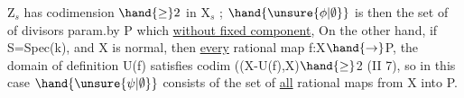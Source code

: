 
Z$_s$ has codimension $\hand{\geq} 2$ in X$_s$ ; 
$\hand{\unsure{\phi|\emptyset}}$ is then the set of   of divisors param.by P which 
\uline{without fixed component},  On the other hand, if
S=Spec(k), and X is normal, then  \uline{every} rational map
f:X$\hand{\to}$P, the domain of definition U(f) satisfies codim ((X-U(f),X)$\hand{\geq}$2
(II 7), so in this case $\hand{\unsure{\psi|\emptyset}}$ consists of the set of \uline{all}
rational maps from X into P.

